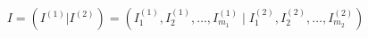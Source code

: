 \begin{equation}
I=(I^{(1)}|I^{(2)})=(I_1^{(1)},I_2^{(1)},\ldots,I_{m_1}^{(1)}\;|\;I_1^{(2)},I_2^{(2)},
\ldots,I_{m_2}^{(2)})
\label{quantumnos}
\end{equation}

